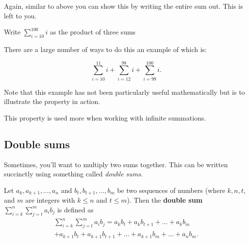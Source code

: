 \documentclass[
  12pt,
  a4paper, oneside]{starmastarticle}
\begin{document}
Again, similar to above you can show this by writing the entire sum out.
This is left to you.

\begin{tcolorbox}[enhanced jigsaw, left=2mm, toprule=.15mm, colback=white, opacityback=0, breakable, colframe=quarto-callout-note-color-frame, leftrule=.75mm, arc=.35mm, rightrule=.15mm, bottomrule=.15mm]
\begin{minipage}[t]{5.5mm}
\textcolor{quarto-callout-note-color}{\faInfo}
\end{minipage}%
\begin{minipage}[t]{\textwidth - 5.5mm}
Write \(\sum_{i=10}^{100}i\) as the product of three sums

There are a large number of ways to do this an example of which is:

\[\sum_{i=10}^{11} i + \sum_{i=12}^{98} i + \sum_{i=99}^{100} i.\]

Note that this example has not been particularly useful mathematically
but is to illustrate the property in action.

This property is used more when working with infinite
summations.\end{minipage}%
\end{tcolorbox}

\hypertarget{double-sums}{%
\subsection{Double sums}\label{double-sums}}

Sometimes, you'll want to multiply two sums together. This can be
written succinctly using something called \emph{double sums}.

\begin{tcolorbox}[enhanced jigsaw, left=2mm, toprule=.15mm, colback=white, opacityback=0, breakable, colframe=quarto-callout-note-color-frame, leftrule=.75mm, arc=.35mm, rightrule=.15mm, bottomrule=.15mm]
\begin{minipage}[t]{5.5mm}
\textcolor{quarto-callout-note-color}{\faInfo}
\end{minipage}%
\begin{minipage}[t]{\textwidth - 5.5mm}
Let \(a_{k},a_{k+1},\ldots,a_n\) and \(b_t,b_{t+1},\ldots,b_m\) be two
sequences of numbers (where \(k,n,t\), and \(m\) are integers with
\(k \leq n\) and \(t \leq m\)). Then the \textbf{double sum}
\(\sum_{i=k}^n\sum_{j=t}^m a_i b_j\) is defined as
\[\begin{multline*} \sum_{i=k}^n\sum_{j=t}^m a_i b_j = a_kb_t + a_kb_{t+1} + \ldots + a_kb_m \\+ a_{k+1}b_t + a_{k+1}b_{t+1} + \ldots + a_{k+1}b_m + \ldots + a_nb_m.\end{multline*}\]\end{minipage}%
\end{tcolorbox}
\end{document}

